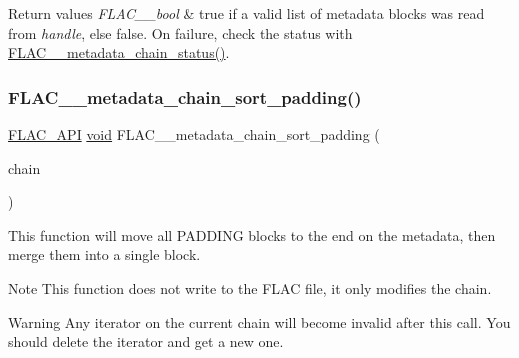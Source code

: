 \begin{DoxyRetVals}{Return values}
{\em F\+L\+A\+C\+\_\+\+\_\+bool} & {\ttfamily true} if a valid list of metadata blocks was read from {\itshape handle}, else {\ttfamily false}. On failure, check the status with \mbox{\hyperlink{group__flac__metadata__level2_ga3d030e216a6517f23372bb76f0639127}{F\+L\+A\+C\+\_\+\+\_\+metadata\+\_\+chain\+\_\+status()}}. \\
\hline
\end{DoxyRetVals}
\mbox{\label{group__flac__metadata__level2_gaa14304da1c8e706808cfafa5cbbf575b}} 
\subsubsection{\texorpdfstring{FLAC\_\_metadata\_chain\_sort\_padding()}{FLAC\_\_metadata\_chain\_sort\_padding()}}
{\footnotesize\ttfamily \mbox{\hyperlink{group__flac__export_ga56ca07df8a23310707732b1c0007d6f5}{F\+L\+A\+C\+\_\+\+A\+PI}} \mbox{\hyperlink{_s_d_l__opengles2__gl2ext_8h_ae5d8fa23ad07c48bb609509eae494c95}{void}} F\+L\+A\+C\+\_\+\+\_\+metadata\+\_\+chain\+\_\+sort\+\_\+padding (\begin{DoxyParamCaption}\item[{\mbox{\hyperlink{group__flac__metadata__level2_gaec6993c60b88f222a52af86f8f47bfdf}{F\+L\+A\+C\+\_\+\+\_\+\+Metadata\+\_\+\+Chain}} $\ast$}]{chain }\end{DoxyParamCaption})}

This function will move all P\+A\+D\+D\+I\+NG blocks to the end on the metadata, then merge them into a single block.

\begin{DoxyNote}{Note}
This function does not write to the F\+L\+AC file, it only modifies the chain.
\end{DoxyNote}
\begin{DoxyWarning}{Warning}
Any iterator on the current chain will become invalid after this call. You should delete the iterator and get a new one.
\end{DoxyWarning}

